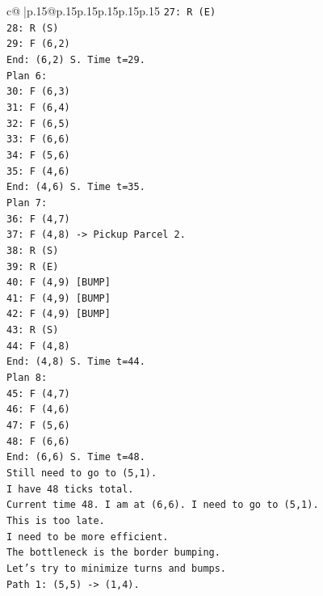 \documentclass{article}
\begin{document}
{\begin{supertabular}{c@{$\;$}|p{.15\linewidth}@{}p{.15\linewidth}p{.15\linewidth}p{.15\linewidth}p{.15\linewidth}p{.15\linewidth}}
{{{\texttt{27: R (E)} \\
\texttt{28: R (S)} \\
\texttt{29: F (6,2)} \\
\texttt{End: (6,2) S. Time t=29.} \\
\texttt{Plan 6:} \\
\texttt{30: F (6,3)} \\
\texttt{31: F (6,4)} \\
\texttt{32: F (6,5)} \\
\texttt{33: F (6,6)} \\
\texttt{34: F (5,6)} \\
\texttt{35: F (4,6)} \\
\texttt{End: (4,6) S. Time t=35.} \\
\texttt{Plan 7:} \\
\texttt{36: F (4,7)} \\
\texttt{37: F (4,8) {-}> Pickup Parcel 2.} \\
\texttt{38: R (S)} \\
\texttt{39: R (E)} \\
\texttt{40: F (4,9) {[}BUMP{]}} \\
\texttt{41: F (4,9) {[}BUMP{]}} \\
\texttt{42: F (4,9) {[}BUMP{]}} \\
\texttt{43: R (S)} \\
\texttt{44: F (4,8)} \\
\texttt{End: (4,8) S. Time t=44.} \\
\texttt{Plan 8:} \\
\texttt{45: F (4,7)} \\
\texttt{46: F (4,6)} \\
\texttt{47: F (5,6)} \\
\texttt{48: F (6,6)} \\
\texttt{End: (6,6) S. Time t=48.} \\
\texttt{Still need to go to (5,1).} \\
\texttt{I have 48 ticks total.} \\
\texttt{Current time 48. I am at (6,6). I need to go to (5,1).} \\
\texttt{This is too late.} \\
\texttt{I need to be more efficient.} \\
\texttt{The bottleneck is the border bumping.} \\
\texttt{Let's try to minimize turns and bumps.} \\
\texttt{Path 1: (5,5) {-}> (1,4).} \\
}}}
\end{supertabular}}
\end{document}
